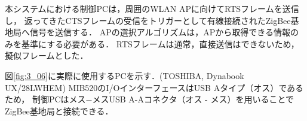 \documentclass[12pt]{jreport}
\begin{document}
本システムにおける制御PCは，周囲のWLAN APに向けてRTSフレームを送信し，
返ってきたCTSフレームの受信をトリガーとして有線接続されたZigBee基地局へ信号を送信する．
APの選択アルゴリズムは，APから取得できる情報のみを基準にする必要がある．
RTSフレームは通常，直接送信はできないため，擬似フレームとした．

図\ref{fig:3_06}に実際に使用するPCを示す．(TOSHIBA, Dynabook UX/28LWHEM)
MIB520のI/OインターフェースはUSB Aタイプ（オス）であるため，
制御PCはメス−メスUSB A-Aコネクタ（オス - メス）を用いることでZigBee基地局と接続できる．

\end{document}

